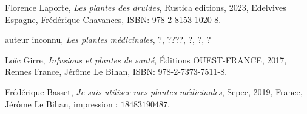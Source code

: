 
\renewcommand{\refname}{}
\begin{thebibliography}{9}

    Florence Laporte,
    \textit{Les plantes des druides},
    Rustica editions, 2023,
    Edelvives Espagne,
    Frédérique Chavances,
    ISBN: 978-2-8153-1020-8.

    auteur inconnu,
    \textit{Les plantes médicinales},
    ?, ????,
    ?,
    ?,
    ?
    
    Loïc Girre,
    \textit{Infusions et plantes de santé},
    \'Editions OUEST-FRANCE, 2017,
    Rennes France,
    Jérôme Le Bihan,
    ISBN: 978-2-7373-7511-8.

    Frédérique Basset,
    \textit{Je sais utiliser mes plantes médicinales},
    Sepec, 2019,
    France,
    Jérôme Le Bihan,
    \no impression : $18483190487$.

\end{thebibliography}